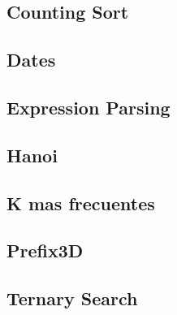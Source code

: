 \subsection{Counting Sort}
\raggedbottom
\hrulefill
\subsection{Dates}
\raggedbottom
\hrulefill
\subsection{Expression Parsing}
\raggedbottom
\hrulefill
\subsection{Hanoi}
\raggedbottom
\hrulefill
\subsection{K mas frecuentes}
\raggedbottom
\hrulefill
\subsection{Prefix3D}
\raggedbottom
\hrulefill
\subsection{Ternary Search}
\raggedbottom
\hrulefill

